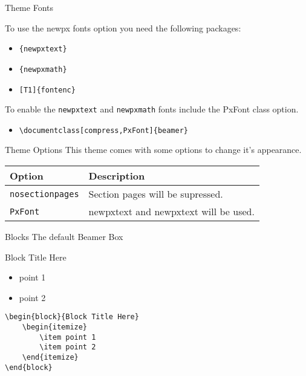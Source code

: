 \documentclass[compress,PxFont]{beamer}
\begin{document}

\begin{frame}[containsverbatim]{Theme Fonts}

To use the newpx fonts option you need the following packages:

\begin{itemize}
	\item \verb|{newpxtext}|
	\item \verb|{newpxmath}|
	\item \verb|[T1]{fontenc}|
\end{itemize}

To enable the \verb|newpxtext| and \verb|newpxmath| fonts include the \alert{PxFont} class option.\\

\begin{itemize}
	\item \verb|\documentclass[compress,PxFont]{beamer}|
\end{itemize}

\end{frame}


\begin{frame}{Theme Options}
This theme comes with some options to change it's appearance.
\begin{table}[]
	\begin{tabularx}{\linewidth}{l>{\raggedright}X}
		\toprule
		\textbf{Option}			& \textbf{Description} \tabularnewline
		\midrule
		\texttt{nosectionpages} & Section pages will be supressed.\tabularnewline
		\texttt{PxFont} & newpxtext and newpxtext will be used.\tabularnewline
		\bottomrule
	\end{tabularx}
	\label{tab:options}
\end{table}
\end{frame}


\begin{frame}[containsverbatim]{Blocks}
The default Beamer Box
\begin{block}{Block Title Here}
	\begin{itemize}
		\item point 1
		\item point 2
	\end{itemize}
\end{block}
\begin{verbatim}
\begin{block}{Block Title Here}
    \begin{itemize}
        \item point 1
        \item point 2
    \end{itemize}
\end{block}
\end{verbatim}
\end{frame}
\end{document}
